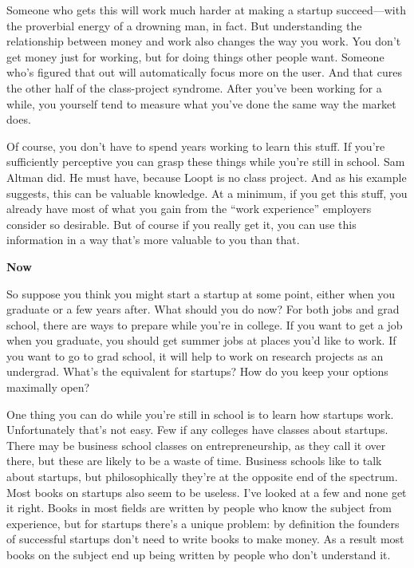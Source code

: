 Someone who gets this will work much harder at making a startup
succeed---with the proverbial energy of a drowning man, in fact. But
understanding the relationship between money and work also changes the
way you work. You don't get money just for working, but for doing things
other people want. Someone who's figured that out will automatically
focus more on the user. And that cures the other half of the
class-project syndrome. After you've been working for a while, you
yourself tend to measure what you've done the same way the market does.

Of course, you don't have to spend years working to learn this stuff. If
you're sufficiently perceptive you can grasp these things while you're
still in school. Sam Altman did. He must have, because Loopt is no class
project. And as his example suggests, this can be valuable knowledge. At
a minimum, if you get this stuff, you already have most of what you gain
from the ``work experience'' employers consider so desirable. But of
course if you really get it, you can use this information in a way
that's more valuable to you than that.

\textbf{Now}

So suppose you think you might start a startup at some point, either
when you graduate or a few years after. What should you do now? For both
jobs and grad school, there are ways to prepare while you're in college.
If you want to get a job when you graduate, you should get summer jobs
at places you'd like to work. If you want to go to grad school, it will
help to work on research projects as an undergrad. What's the equivalent
for startups? How do you keep your options maximally open?

One thing you can do while you're still in school is to learn how
startups work. Unfortunately that's not easy. Few if any colleges have
classes about startups. There may be business school classes on
entrepreneurship, as they call it over there, but these are likely to be
a waste of time. Business schools like to talk about startups, but
philosophically they're at the opposite end of the spectrum. Most books
on startups also seem to be useless. I've looked at a few and none get
it right. Books in most fields are written by people who know the
subject from experience, but for startups there's a unique problem: by
definition the founders of successful startups don't need to write books
to make money. As a result most books on the subject end up being
written by people who don't understand it.

